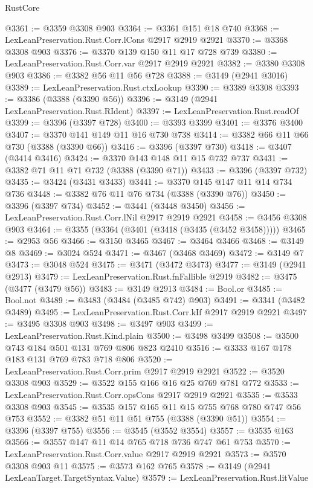 \begin{lexlean}{RustCore}
\begin{coremodule}
@3361 := @3359 @3308 @903
@3364 := @3361 @151 @18 @740
@3368 := LexLeanPreservation.Rust.Corr.lCons @2917 @2919 @2921
@3370 := @3368 @3308 @903
@3376 := @3370 @139 @150 @11 @17 @728 @739
@3380 := LexLeanPreservation.Rust.Corr.var @2917 @2919 @2921
@3382 := @3380 @3308 @903
@3386 := @3382 @56 @11 @56 @728
@3388 := @3149 (@2941 @3016)
@3389 := LexLeanPreservation.Rust.ctxLookup
@3390 := @3389 @3308
@3393 := @3386 (@3388 (@3390 @56))
@3396 := @3149 (@2941 LexLeanPreservation.Rust.RIdent)
@3397 := LexLeanPreservation.Rust.readOf
@3399 := @3396 (@3397 @728)
@3400 := @3393 @3399
@3401 := @3376 @3400
@3407 := @3370 @141 @149 @11 @16 @730 @738
@3414 := @3382 @66 @11 @66 @730 (@3388 (@3390 @66))
@3416 := @3396 (@3397 @730)
@3418 := @3407 (@3414 @3416)
@3424 := @3370 @143 @148 @11 @15 @732 @737
@3431 := @3382 @71 @11 @71 @732 (@3388 (@3390 @71))
@3433 := @3396 (@3397 @732)
@3435 := @3424 (@3431 @3433)
@3441 := @3370 @145 @147 @11 @14 @734 @736
@3448 := @3382 @76 @11 @76 @734 (@3388 (@3390 @76))
@3450 := @3396 (@3397 @734)
@3452 := @3441 (@3448 @3450)
@3456 := LexLeanPreservation.Rust.Corr.lNil @2917 @2919 @2921
@3458 := @3456 @3308 @903
@3464 := @3355 (@3364 (@3401 (@3418 (@3435 (@3452 @3458)))))
@3465 := @2953 @56
@3466 := @3150 @3465
@3467 := @3464 @3466
@3468 := @3149 @8
@3469 := @3024 @524
@3471 := @3467 (@3468 @3469)
@3472 := @3149 @7
@3473 := @3048 @524
@3475 := @3471 (@3472 @3473)
@3477 := @3149 (@2941 @2913)
@3479 := LexLeanPreservation.Rust.fnFallible @2919
@3482 := @3475 (@3477 (@3479 @56))
@3483 := @3149 @2913
@3484 := Bool.or
@3485 := Bool.not
@3489 := @3483 (@3484 (@3485 @742) @903)
@3491 := @3341 (@3482 @3489)
@3495 := LexLeanPreservation.Rust.Corr.kIf @2917 @2919 @2921
@3497 := @3495 @3308 @903
@3498 := @3497 @903
@3499 := LexLeanPreservation.Rust.Kind.plain
@3500 := @3498 @3499
@3508 := @3500 @743 @184 @501 @131 @769 @806 @823 @2410
@3516 := @3333 @167 @178 @183 @131 @769 @783 @718 @806
@3520 := LexLeanPreservation.Rust.Corr.prim @2917 @2919 @2921
@3522 := @3520 @3308 @903
@3529 := @3522 @155 @166 @16 @25 @769 @781 @772
@3533 := LexLeanPreservation.Rust.Corr.opsCons @2917 @2919 @2921
@3535 := @3533 @3308 @903
@3545 := @3535 @157 @165 @11 @15 @755 @768 @780 @747 @56 @753
@3552 := @3382 @51 @11 @51 @755 (@3388 (@3390 @51))
@3554 := @3396 (@3397 @755)
@3556 := @3545 (@3552 @3554)
@3557 := @3535 @163
@3566 := @3557 @147 @11 @14 @765 @718 @736 @747 @61 @753
@3570 := LexLeanPreservation.Rust.Corr.value @2917 @2919 @2921
@3573 := @3570 @3308 @903 @11
@3575 := @3573 @162 @765
@3578 := @3149 (@2941 LexLeanTarget.TargetSyntax.Value)
@3579 := LexLeanPreservation.Rust.litValue

\end{coremodule}
\end{lexlean}
